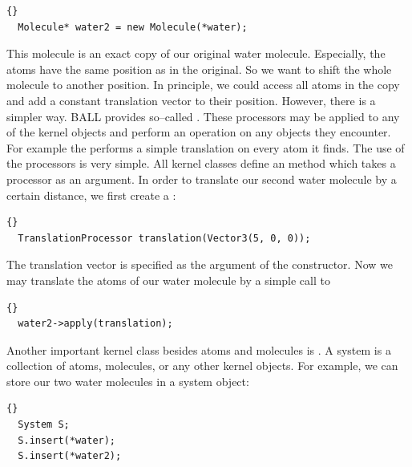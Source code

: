 \begin{lstlisting}{}
  Molecule* water2 = new Molecule(*water);
\end{lstlisting}
	
\noindent
This molecule is an exact copy of our original water molecule. Especially, the
atoms have the same position as in the original. So we want to shift the whole
molecule to another position.  In principle, we could access all atoms in the
copy and add a constant translation vector to their position. However, there
is a simpler way. BALL provides so--called . These
processors may be applied to any of the kernel objects and perform an
operation on any objects they encounter. For example the
 performs a simple translation on every atom it
finds. The use of the processors is very simple.  All kernel classes define an
 method which takes a processor as an argument. In order to
translate our second water molecule by a certain distance, we first create a
:

\begin{lstlisting}{}
  TranslationProcessor translation(Vector3(5, 0, 0));
\end{lstlisting}
	
\noindent
The translation vector is specified as the argument of the constructor. Now we
may translate the atoms of our water molecule by a simple call to 

\begin{lstlisting}{}
  water2->apply(translation);
\end{lstlisting}

\noindent
Another important kernel class besides atoms and molecules is .
A system is a collection of atoms, molecules, or any other kernel objects. For
example, we can store our two water molecules in a system object:

\begin{lstlisting}{}
  System S;
  S.insert(*water);
  S.insert(*water2);
\end{lstlisting}


